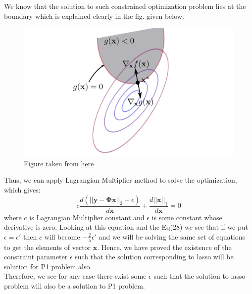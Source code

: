 \documentclass[12pt]{article}
\begin{document}
We know that the solution to such constrained optimization problem lies at the boundary which is explained clearly in the fig. given below.
\begin{figure}[H]
  \centering
  \includegraphics[scale=0.7]{fig6.png}  %
  \caption{Figure taken from \href{http://www.juyang.co/numerical-optimization-in-machine-learning-iii-constrained-optimization/}{here}}
  \label{fig:9}
\end{figure}
Thus, we can apply Lagrangian Multiplier method to solve the optimization, which gives:
\begin{equation*}
    c\frac{d(||\boldsymbol{y-\Phi x}||_2-\epsilon)}{d\boldsymbol{x}} + \frac{d||\boldsymbol{x}||_1}{d\boldsymbol{x}} = 0
\end{equation*}
where c is Lagrangian Multiplier constant and $\epsilon$ is some constant whose derivative is zero. Looking at this equation and the Eq(28) we see that if we put $\epsilon = \epsilon'$ then $c$ will become $-\frac{2}{\lambda}\epsilon'$ and we will be solving the same set of equations to get the elements of vector $\boldsymbol{x}$. Hence, we have proved the existence of the constraint parameter $\epsilon$ such that the solution corresponding to lasso will be solution for P1 problem also.\\
Therefore, we see for any case there exist some $\epsilon$ such that the solution to lasso problem will also be a solution to P1 problem.
\end{document}
